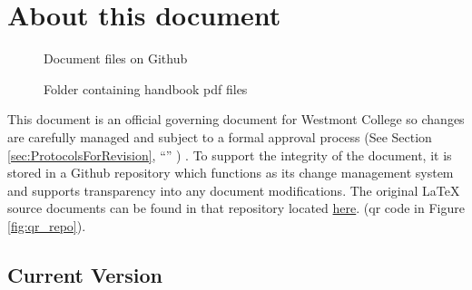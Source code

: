 \section{About this document}
	\label{sec:AboutThisDocument}


	\begin{figure}
		\centering
		\vspace{-30pt}
		\caption{Document files on Github}
		\label{fig:qr_repo}
		\vspace{10pt}
		\caption{Folder containing handbook pdf files}
		\label{fig:qr_releases}
	\end{figure}


	This document is an official governing document for Westmont College so changes are carefully managed and subject to a formal approval process
	(See Section
	\ref{sec:ProtocolsForRevision},
	``''
	) .
	To support the integrity of the document, it is stored in a Github repository which functions as its change management system and supports transparency into any document modifications.
	The original LaTeX source documents can be found in that repository located
	\href{https://github.com/djp3/WestmontFacultyHandbook}{here}.
	(qr code in Figure \ref{fig:qr_repo}).


	\subsection{Current Version}


